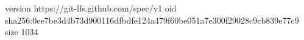 version https://git-lfs.github.com/spec/v1
oid sha256:0ee7be3d4b73d900116dfbdfe124a479f60be051a7e300f29028c9cb839e77c9
size 1034
